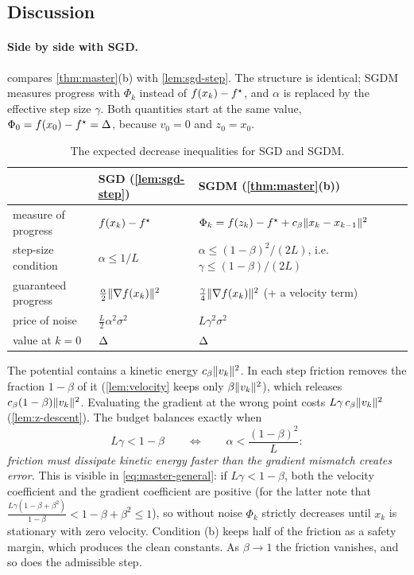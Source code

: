 \subsection{Discussion}

\paragraph{Side by side with SGD.}  compares
\cref{thm:master}(b) with \cref{lem:sgd-step}. The structure is identical; SGDM measures
progress with $\Phi_k$ instead of $f(x_k)-f^\star$, and $\alpha$ is replaced by the effective
step size $\gamma$. Both quantities start at the same value, $\Phi_0=f(x_0)-f^\star=\Delta$,
because $v_0=0$ and $z_0=x_0$.

\begin{table}[ht]
\centering\small
\renewcommand{\arraystretch}{1.3}
\begin{tabular}{@{}lll@{}}
\toprule
 & SGD (\cref{lem:sgd-step}) & SGDM (\cref{thm:master}(b))\\
\midrule
measure of progress & $f(x_k)-f^\star$ & $\Phi_k=f(z_k)-f^\star+c_\beta\lVert x_k-x_{k-1}\rVert^2$\\
step-size condition & $\alpha\le1/L$ & $\alpha\le(1-\beta)^2/(2L)$, i.e.\ $\gamma\le(1-\beta)/(2L)$\\
guaranteed progress & $\frac\alpha2\lVert \nabla f(x_k)\rVert^2$ & $\frac\gamma4\lVert \nabla f(x_k)\rVert^2$ (+ a velocity term)\\
price of noise & $\frac L2\alpha^2\sigma^2$ & $L\gamma^2\sigma^2$\\
value at $k=0$ & $\Delta$ & $\Delta$\\
\bottomrule
\end{tabular}
\caption{The expected decrease inequalities for SGD and SGDM.}
\label{tab:side-by-side}
\end{table}

\begin{tcolorbox}[intuition,title=Where the step-size condition comes from: an energy budget]
The potential contains a kinetic energy $c_\beta\lVert v_k\rVert^2$. In each step friction removes
the fraction $1-\beta$ of it (\cref{lem:velocity} keeps only $\beta\lVert v_k\rVert^2$), which
releases $c_\beta(1-\beta)\lVert v_k\rVert^2$. Evaluating the gradient at the wrong point costs
$L\gamma\,c_\beta\lVert v_k\rVert^2$ (\cref{lem:z-descent}). The budget balances exactly when
\[
  L\gamma<1-\beta\qquad\Longleftrightarrow\qquad\alpha<\frac{(1-\beta)^2}{L}:
\]
\emph{friction must dissipate kinetic energy faster than the gradient mismatch creates
error.} This is visible in \eqref{eq:master-general}: if $L\gamma<1-\beta$, both the
velocity coefficient and the gradient coefficient are positive (for the latter note that
$\frac{L\gamma(1-\beta+\beta^2)}{1-\beta}<1-\beta+\beta^2\le1$), so without noise
$\Phi_k$ strictly decreases until $x_k$ is stationary with zero velocity. Condition (b)
keeps half of the friction as a safety margin, which produces the clean constants. As
$\beta\to1$ the friction vanishes, and so does the admissible step.
\end{tcolorbox}

